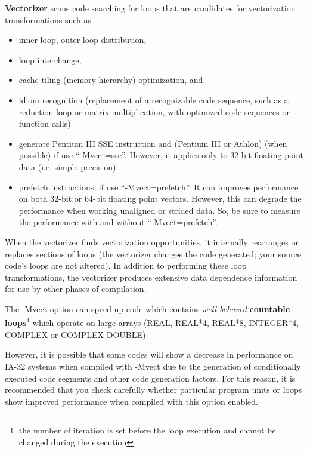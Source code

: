 {\bf Vectorizer} scans code searching for loops that are candidates
for vectorization transformations such as
\begin{itemize}
\item inner-loop, outer-loop distribution,
\item \hyperref[sec:loop-interchange]{loop interchange},
\item cache tiling (memory hierarchy) optimization, and 
\item idiom recognition (replacement of a recognizable code sequence,
  such as a reduction loop or matrix multiplication, with optimized
  code sequences or function calls)
\item generate Pentium III SSE instruction and (Pentium III or Athlon)
  (when possible) if use ``-Mvect=sse''. However, it applies only to
  32-bit floating point data (i.e. simple precision).
\item prefetch instructions, if use ``-Mvect=prefetch''. It can
  improves performance on both 32-bit or 64-bit floating point
  vectors. However, this can degrade the performance when working
  unaligned or strided data. So, be sure to measure the performance
  with and without ``-Mvect=prefetch''.
\end{itemize}

When the vectorizer finds vectorization opportunities, it internally
rearranges or replaces sections of loops (the vectorizer changes the
code generated; your source code's loops are not altered). In addition
to performing these loop transformations, the vectorizer produces
extensive data dependence information for use by other phases of
compilation.  

The -Mvect option can speed up code which contains {\it well-behaved}
{\bf countable
  loops}\footnote{the
  number of iteration is set before the loop execution and cannot be
  changed during the execution}
which operate on large arrays (REAL, REAL*4, REAL*8, INTEGER*4,
COMPLEX or COMPLEX DOUBLE).

However, it is possible that some codes will show a decrease in
performance on IA-32 systems when compiled with -Mvect due to the
generation of conditionally executed code segments and other code
generation factors. For this reason, it is recommended that you check
carefully whether particular program units or loops show improved
performance when compiled with this option enabled.

